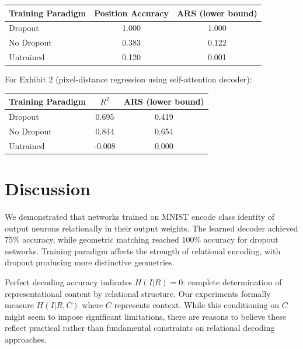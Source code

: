 \documentclass[11pt]{article}
\begin{document}
\begin{center}
\begin{tabular}{lcc}
\toprule
Training Paradigm & Position Accuracy & ARS (lower bound) \\
\midrule
Dropout & 1.000 & 1.000 \\
No Dropout & 0.383 & 0.122 \\
Untrained & 0.120 & 0.001 \\
\bottomrule
\end{tabular}
\end{center}

For Exhibit 2 (pixel-distance regression using self-attention decoder):

\begin{center}
\begin{tabular}{lcc}
\toprule
Training Paradigm & $R^2$ & ARS (lower bound) \\
\midrule
Dropout & 0.695 & 0.419 \\
No Dropout & 0.844 & 0.654 \\
Untrained & -0.008 & 0.000 \\
\bottomrule
\end{tabular}
\end{center}

\section{Discussion}

We demonstrated that networks trained on MNIST encode class identity of output neurons relationally in their output weights. The learned decoder achieved 75\% accuracy, while geometric matching reached 100\% accuracy for dropout networks. Training paradigm affects the strength of relational encoding, with dropout producing more distinctive geometries.

Perfect decoding accuracy indicates $H(I|R) = 0$: complete determination of representational content by relational structure. Our experiments formally measure $H(I|R,C)$ where $C$ represents context. While this conditioning on $C$ might seem to impose significant limitations, there are reasons to believe these reflect practical rather than fundamental constraints on relational decoding approaches.
\end{document}
